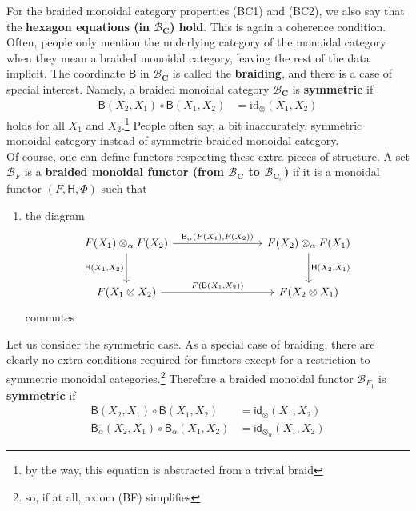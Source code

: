 For the braided monoidal category properties (BC1) and (BC2), we also say that the \textbf{hexagon equations (in $\mathcal{B}_{\mathbf{C}}$) hold}.
This is again a coherence condition.
Often, people only mention the underlying category of the monoidal category when they mean a braided monoidal category, leaving the rest of the data implicit.
The coordinate $\mathsf{B}$ in $\mathcal{B}_{\mathbf{C}}$ is called the \textbf{braiding}, and there is a case of special interest.
Namely, a braided monoidal category $\mathcal{B}_{\mathbf{C}}$ is \textbf{symmetric} if
\begin{align*}
  \mathsf{B}(X_{2},X_{1})
  \circ
  \mathsf{B}(X_{1},X_{2})
  &=
  \mathrm{id}_{\otimes}(X_{1},X_{2})
\end{align*}
holds for all $X_{1}$ and $X_{2}$.\footnote{by the way, this equation is abstracted from a trivial braid}
People often say, a bit inaccurately, {\glqq}symmetric monoidal category{\grqq} instead of {\glqq}symmetric braided monoidal category{\grqq}.
\\
Of course, one can define functors respecting these extra pieces of structure.
A set $\mathcal{B}_{F}$ is a \textbf{braided monoidal functor (from $\mathcal{B}_{\mathbf{C}}$ to $\mathcal{B}_{\mathbf{C}_{\alpha}}$)} if it is a monoidal functor $(F,\mathsf{H},\Phi)$ such that
\begin{enumerate}
\item[(BF)]
the diagram
\[
\begin{tikzcd}[row sep=large,column sep=8em]
  F(X_{1})
  \otimes_{\alpha}
  F(X_{2})
  \arrow{r}{\mathsf{B}_{\alpha}(F(X_{1}),F(X_{2}))}
  \arrow[swap]{d}{\mathsf{H}(X_{1},X_{2})}
  &
  F(X_{2})
  \otimes_{\alpha}
  F(X_{1})
  \arrow{d}{\mathsf{H}(X_{2},X_{1})}
  \\
  F(X_{1} \otimes X_{2})
  \arrow{r}{F(\mathsf{B}(X_{1},X_{2}))}
  &
  F(X_{2} \otimes X_{1})
\end{tikzcd}
\]
commutes
\end{enumerate}
Let us consider the symmetric case.
As a special case of braiding, there are clearly no extra conditions required for functors except for a restriction to symmetric monoidal categories.\footnote{so, if at all, axiom (BF) simplifies} Therefore a braided monoidal functor $\mathcal{B}_{F_{1}}$ is \textbf{symmetric} if
\begin{align*}
  \mathsf{B}(X_{2},X_{1})
  \circ
  \mathsf{B}(X_{1},X_{2})
  &=
  \mathsf{id}_{\otimes}(X_{1},X_{2})
  \\
  \mathsf{B_{\alpha}}(X_{2},X_{1})
  \circ
  \mathsf{B_{\alpha}}(X_{1},X_{2})
  &=
  \mathsf{id}_{\otimes_{\alpha}}(X_{1},X_{2})
\end{align*}
